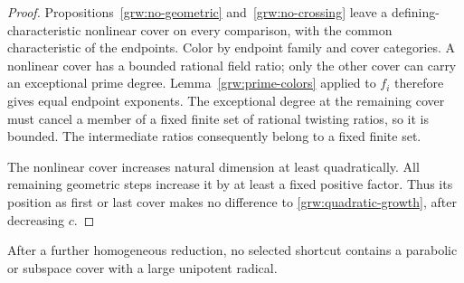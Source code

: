 \begin{proof}
Propositions~\ref{grw:no-geometric} and~\ref{grw:no-crossing} leave a
defining-characteristic nonlinear cover on every comparison, with the
common characteristic of the endpoints. Color by endpoint family
and cover categories.  A nonlinear cover has a bounded rational field
ratio; only the other cover can carry an exceptional prime degree.
Lemma~\ref{grw:prime-colors} applied to $f_i$ therefore gives equal
endpoint exponents.  The exceptional degree at the remaining cover
must cancel a member of a fixed finite set of rational twisting ratios,
so it is bounded.  The intermediate ratios consequently belong to a
fixed finite set.

The nonlinear cover increases natural dimension at least quadratically.
All remaining geometric steps increase it by at least a fixed positive
factor.  Thus its position as first or last cover makes no difference
to \eqref{grw:quadratic-growth}, after decreasing $c$.
\end{proof}

\begin{lemma}\label{grw:no-parabolic-cover}
After a further homogeneous reduction, no selected shortcut contains
a parabolic or subspace cover with a large unipotent radical.
\end{lemma}

